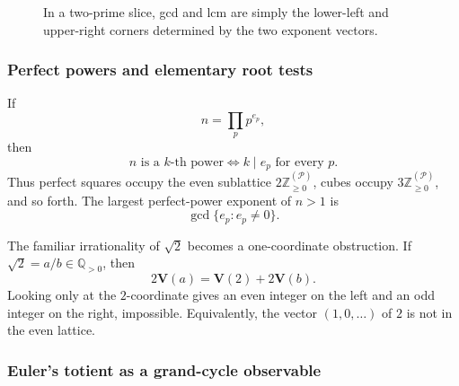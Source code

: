 \documentclass[11pt,a4paper]{article}
\theoremstyle{clockplain}
\theoremstyle{definition}
\theoremstyle{remark}
\newcommand{\Q}{\mathbb Q}
\newcommand{\Z}{\mathbb Z}
\newcommand{\Pset}{\mathcal P}
\newcommand{\V}{\mathbf V}
\newcommand{\lcm}{\operatorname{lcm}}
\begin{document}
\begin{figure}[ht]
\centering
{}
\caption{In a two-prime slice, gcd and lcm are simply the lower-left and upper-right corners determined by the two exponent vectors.}
\label{fig:gcdlcm}
\end{figure}

\subsubsection{Perfect powers and elementary root tests}

If
\[
n=\prod_p p^{e_p},
\]
then
\begin{equation}
\boxed{n\text{ is a }k\text{-th power}\iff k\mid e_p\text{ for every }p.}
\label{eq:kthpower}
\end{equation}
Thus perfect squares occupy the even sublattice $2\Z_{\ge0}^{(\Pset)}$, cubes occupy $3\Z_{\ge0}^{(\Pset)}$, and so forth. The largest perfect-power exponent of $n>1$ is
\[
\gcd\{e_p:e_p\ne0\}.
\]

The familiar irrationality of $\sqrt2$ becomes a one-coordinate obstruction. If $\sqrt2=a/b\in\Q_{>0}$, then
\[
2\V(a)=\V(2)+2\V(b).
\]
Looking only at the $2$-coordinate gives an even integer on the left and an odd integer on the right, impossible. Equivalently, the vector $(1,0,\ldots)$ of $2$ is not in the even lattice.

\subsubsection{Euler's totient as a grand-cycle observable}
\end{document}
